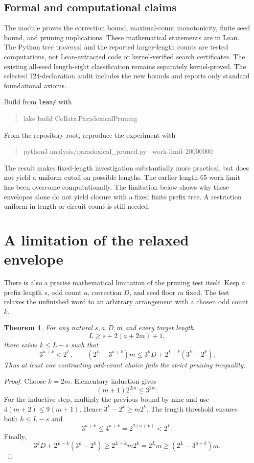 \documentclass[11pt]{article}
\newtheorem{theorem}{Theorem}
\begin{document}
\subsection*{Formal and computational claims}
The module proves the correction bound, maximal-count monotonicity, finite seed bound, and pruning implications. These mathematical statements are in Lean. The Python tree traversal and the reported larger-length counts are tested computations, not Lean-extracted code or kernel-verified search certificates. The existing all-seed length-eight classification remains separately kernel-proved. The selected 124-declaration audit includes the new bounds and reports only standard foundational axioms.

Build from \texttt{lean/} with
\begin{quote}\small\ttfamily
lake build Collatz.ParadoxicalPruning
\end{quote}
From the repository root, reproduce the experiment with
\begin{quote}\small\ttfamily
python3 analysis/paradoxical\_pruned.py --work-limit 20000000
\end{quote}
The result makes fixed-length investigation substantially more practical, but does not yield a uniform cutoff on possible lengths. The earlier length-65 work limit has been overcome computationally. The limitation below shows why these envelopes alone do not yield closure with a fixed finite prefix tree. A restriction uniform in length or circuit count is still needed.


\section{A limitation of the relaxed envelope}
There is also a precise mathematical limitation of the pruning test itself. Keep a prefix length $s$, odd count $a$, correction $D$, and seed floor $m$ fixed. The test relaxes the unfinished word to an arbitrary arrangement with a chosen odd count $k$.

\begin{theorem}\label{thm:limit}
For any natural $s,a,D,m$ and every target length
\[
L\ge s+2(a+2m)+1,
\]
there exists $k\le L-s$ such that
\[
3^{a+k}<2^L,\qquad
(2^L-3^{a+k})m\le3^kD+2^{L-k}(3^k-2^k).
\]
Thus at least one contracting odd-count choice fails the strict pruning inequality.
\end{theorem}
\begin{proof}
Choose $k=2m$. Elementary induction gives
\[
(m+1)2^{2m}\le3^{2m}.
\]
For the inductive step, multiply the previous bound by nine and use $4(m+2)\le9(m+1)$. Hence $3^k-2^k\ge m2^k$. The length threshold ensures both $k\le L-s$ and
\[
3^{a+k}\le4^{a+k}=2^{2(a+k)}<2^L.
\]
Finally,
\[
3^kD+2^{L-k}(3^k-2^k)\ge2^{L-k}m2^k=2^Lm
\ge(2^L-3^{a+k})m.
\]
\end{proof}
\end{document}

